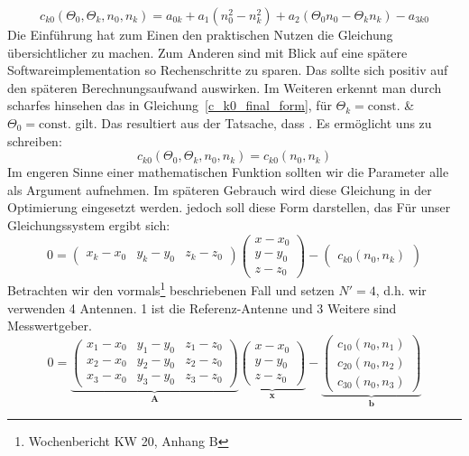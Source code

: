 \begin{equation}
c_{k0}(\Theta_0, \Theta_k, n_0, n_k) = a_{0k}+a_1(n_0^2-n_k^2)+a_2(\Theta_0n_0-\Theta_kn_k)-a_{3k0}\label{c_k0_final_form}   
\end{equation}
%
Die Einführung hat zum Einen den praktischen Nutzen die Gleichung übersichtlicher zu machen. Zum Anderen sind mit Blick auf eine spätere Softwareimplementation so Rechenschritte zu sparen. Das sollte sich positiv auf den späteren Berechnungsaufwand auswirken.
%
Im Weiteren erkennt man durch scharfes hinsehen das in Gleichung~\eqref{c_k0_final_form}, für $\Theta_k=\text{const.}$ \& $\Theta_0=\text{const.}$ gilt. Das resultiert aus der Tatsache, dass . Es ermöglicht uns zu schreiben:
\begin{equation}
c_{k0}(\Theta_0, \Theta_k, n_0, n_k) = c_{k0}(n_0, n_k)
\end{equation}
%
Im engeren Sinne einer mathematischen Funktion sollten wir die Parameter alle als Argument aufnehmen. Im späteren Gebrauch wird diese Gleichung in der Optimierung eingesetzt werden. jedoch soll diese Form darstellen, das
Für unser Gleichungssystem ergibt sich:
\begin{equation}\label{eq:wavenumber_trilateration_model}
0=
\left(
	\begin{array}{ccc}
		x_k-x_0 & y_k-y_0 & z_k-z_0 
	\end{array}
\right)
\left(
   \begin{array}{c}
	   x-x_0\\
	   y-y_0\\
	   z-z_0
   \end{array}
\right)
-
\left(
	\begin{array}{c}
		c_{k0}(n_0, n_k)
	\end{array}
\right)
\end{equation}
%
Betrachten wir den vormals\footnote{Wochenbericht KW 20, Anhang B} beschriebenen Fall und setzen $N'=4$, d.h. wir verwenden 4 Antennen. 1 ist die Referenz-Antenne und 3 Weitere sind Messwertgeber.
%
\begin{equation}\label{eq:wavenumber_trilateration_model_explicit}
0=
\underbrace{\left(
	\begin{array}{ccc}
		x_1-x_0 & y_1-y_0 & z_1-z_0 \\
		x_2-x_0 & y_2-y_0 & z_2-z_0 \\
		x_3-x_0 & y_3-y_0 & z_3-z_0 
	\end{array}
\right)}_{\textbf{A}}
\underbrace{\left(
   \begin{array}{c}
	   x-x_0\\
	   y-y_0\\
	   z-z_0
   \end{array}
\right)}_{\textbf{x}}
-
\underbrace{\left(
	\begin{array}{c}
		c_{10}(n_0, n_1) \\
		c_{20}(n_0, n_2) \\
		c_{30}(n_0, n_3)
	\end{array}
\right)}_{\textbf{b}}
\end{equation}
